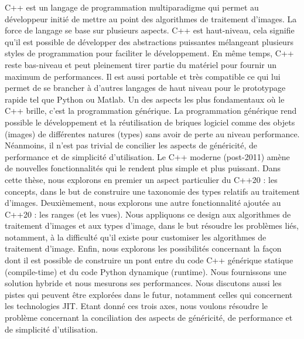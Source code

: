 \noindent C++ est un langage de programmation multiparadigme qui permet au développeur initié de mettre au point des
algorithmes de traitement d'images. La force de langage se base sur plusieurs aspects. C++ est haut-niveau, cela
signifie qu'il est possible de développer des abstractions puissantes mélangeant plusieurs styles de programmation pour
faciliter le développement. En même temps, C++ reste bas-niveau et peut pleinement tirer partie du matériel pour fournir
un maximum de performances. Il est aussi portable et très compatible ce qui lui permet de se brancher à d'autres
langages de haut niveau pour le prototypage rapide tel que Python ou Matlab. Un des aspects les plus fondamentaux où le
C++ brille, c'est la programmation générique. La programmation générique rend possible le développement et la
réutilisation de briques logiciel comme des objets (images) de différentes natures (types) sans avoir de perte au niveau
performance. Néanmoins, il n'est pas trivial de concilier les aspects de généricité, de performance et de simplicité
d'utilisation. Le C++ moderne (post-2011) amène de nouvelles fonctionnalités qui le rendent plus simple et plus
puissant. Dans cette thèse, nous explorons en premier un aspect particulier du C++20 : les concepts, dans le but de
construire une taxonomie des types relatifs au traitement d'images. Deuxièmement, nous explorons une autre
fonctionnalité ajoutée au C++20 : les ranges (et les vues). Nous appliquons ce design aux algorithmes de traitement
d'images et aux types d'image, dans le but résoudre les problèmes liés, notamment, à la difficulté qu'il existe pour
customiser les algorithmes de traitement d'image. Enfin, nous explorons les possibilités concernant la façon dont il est
possible de construire un pont entre du code C++ générique statique (compile-time) et du code Python dynamique
(runtime). Nous fournissons une solution hybride et nous mesurons ses performances. Nous discutons aussi les pistes qui
peuvent être explorées dans le futur, notamment celles qui concernent les technologies JIT. Etant donné ces trois axes,
nous voulons résoudre le problème concernant la conciliation des aspects de généricité, de performance et de simplicité
d'utilisation.

